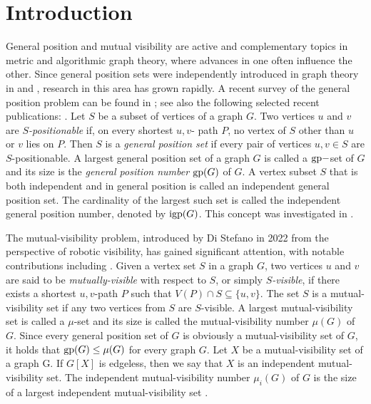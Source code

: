 \documentclass[a4paper,12pt]{article}
\newcommand{\gp}{{\rm gp}}
\newcommand{\igp}{{\rm igp}}
\begin{document}
\section{Introduction}\label{sec:intro}
General position and mutual visibility are active and complementary topics in metric and algorithmic graph theory, where advances in one often influence the other. Since general position sets were independently introduced in graph theory in \cite{3} and \cite{19}, research in this area has grown rapidly. A recent survey of the general position problem can be found in \cite{5}; see also the following selected recent publications: \cite{1,9,12,17,18,29,30}. Let $S$ be a subset of vertices of a graph $G$. Two vertices $u$ and $v$ are \emph{$S$-positionable} if, on every shortest $u,v$- path $P$, no vertex of $S$ other than $u$ or $v$ lies on $P$. Then $S$ is a \emph{general position set} if every pair of vertices $u, v \in S$ are $S$-positionable. A largest general position set of a graph $G$ is called a $\gp-$set of $G$ and its size is the \textit{general position number} $\gp(G)$ of $G$. A vertex subset $S$ that is both independent and in general position is called an independent general position set. The cardinality of the largest such set is called the independent general position number, denoted by 
$\igp(G)$. This concept was investigated in \cite{27}.

The mutual-visibility problem, introduced by Di Stefano in 2022 \cite{24} from the perspective of robotic visibility, has gained significant attention, with notable contributions including \cite{mv1, mv2, mv3, mv4, mv5, mv6, mv7, mv8, mv9}.
Given a vertex set $S$ in a graph $G$, two vertices $u$ and $v$ are said to be \emph{mutually-visible} with respect to $S$, or simply \emph{$S$-visible}, if there exists a shortest $u,v$-path $P$ such that $V(P) \cap S \subseteq \{u, v\}$.
The set $S$ is a
mutual-visibility set if any two vertices from $S$ are $S$-visible. A largest mutual-visibility set is called a $\mu$-set and its size is called the mutual-visibility number $\mu(G)$ of $G$. Since every general position set of $G$ is obviously a mutual-visibility set of $G$, it holds that $\gp(G) \leq \mu(G)$ for every graph $G$. Let $X$ be a mutual-visibility set of a graph G. If $G[X]$ is edgeless, then we say that $X$ is an independent mutual-visibility set. The independent mutual-visibility number $\mu_{i}(G)$ of $G$ is the size of a largest independent mutual-visibility set \cite{mv5}.
 
\end{document}

